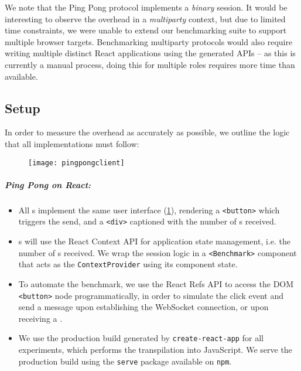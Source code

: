 We note that the Ping Pong protocol implements a \textit{binary} session. 
It would be interesting to observe the overhead in a \textit{multiparty}
context, but due to limited time constraints, we were unable to 
extend our benchmarking suite to support multiple browser targets.
Benchmarking multiparty protocols would also require writing multiple
distinct React applications using the generated APIs -- as this is currently
a manual process, doing this for multiple roles requires more time than
available.

\subsection{Setup}

In order to measure the overhead as accurately as possible,
we outline the logic that all implementations must follow:

\begin{figure}[!ht]
\centering
\texttt{[image: pingpongclient]}
\label{fig:pingpongclient}
\end{figure}

\subparagraph{Ping Pong  on React:}
\begin{itemize}

\item All s implement the same user interface 
(\cref{fig:pingpongclient}), rendering
a \texttt{<button>} which triggers the send, and
a \texttt{<div>} captioned with the number of s received.

\item {}s will use the React Context API \cite{reactcontext}
for application state management, i.e. the number of s received. 
We wrap the session logic in a \texttt{<Benchmark>} component 
that acts as the \texttt{ContextProvider} using its component state.

\item To automate the benchmark, we use the React Refs API \cite{reactrefs}
to access the DOM \texttt{<button>} node programmatically, in order to
simulate the click event and send a  message upon establishing
the WebSocket connection, or upon receiving a .

\item We use the production build generated by 
\texttt{create-react-app} \cite{cra} for all experiments, which performs the
transpilation into JavaScript. We serve the production build using the
\texttt{serve} package \cite{npmserve} available on \texttt{npm}.

\end{itemize}

